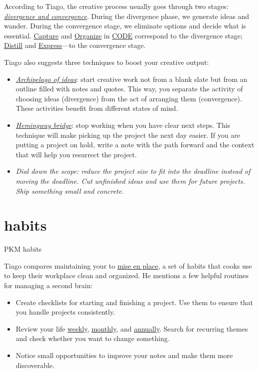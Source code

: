 \documentclass{article}
\begin{document}
According to Tiago, the creative process usually goes through two stages: \href{https://fortelabs.com/blog/divergence-and-convergence-the-two-fundamental-stages-of-the-creative-process/}{\em{divergence} and \em{convergence}}.
During the divergence phase, we generate ideas and wander.
During the convergence stage, we eliminate options and decide what is essential.
\href{#capture}{Capture} and \href{#organize}{Organize} in \href{#code}{CODE} correspond to the divergence stage; \href{#distill}{Distill} and \href{#express}{Express}---to the convergence stage.

Tiago also suggests three techniques to boost your creative output:
\begin{itemize}
  \item 
    \href{https://fortelabs.com/blog/just-in-time-pm-21-workflow-strategies/}{\em{Archipelago of ideas}}: start creative work not from a blank slate but from an outline filled with notes and quotes.
    This way, you separate the activity of choosing ideas (divergence) from the act of arranging them (convergence).
    These activities benefit from different states of mind.
  \item 
    \href{https://medium.com/@mstine/day-6-how-you-can-use-hemingways-bridge-to-ship-today-s-momentum-to-tomorrow-a1af14e300ef}{\em{Hemingway bridge}}: stop working when you have clear next steps.
    This technique will make picking up the project the next day easier.
    If you are putting a project on hold, write a note with the path forward and the context that will help you resurrect the project.
  \item 
    \em{Dial down the scope}: reduce the project size to fit into the deadline instead of moving the deadline.
    Cut unfinished ideas and use them for future projects.
    Ship something small and concrete.
\end{itemize}

\section{habits}{PKM habits}

Tiago compares maintaining your  to \href{https://en.wikipedia.org/wiki/Mise_en_place}{mise en place}, a set of habits that cooks use to keep their workplace clean and organized.
He mentions a few helpful routines for managing a second brain:
\begin{itemize}
  \item 
    Create checklists for starting and finishing a project.
    Use them to ensure that you handle projects consistently.
  \item 
    Review your life \href{https://fortelabs.com/blog/the-weekly-review-is-an-operating-system/}{weekly}, \href{https://fortelabs.com/blog/the-monthly-review-is-a-systems-check/}{monthly}, and \href{https://fortelabs.com/blog/the-annual-review-is-a-rearchitecture/}{annually}.
    Search for recurring themes and check whether you want to change something.
  \item 
     Notice small opportunities to improve your notes and make them more discoverable.
\end{itemize}
\end{document}
